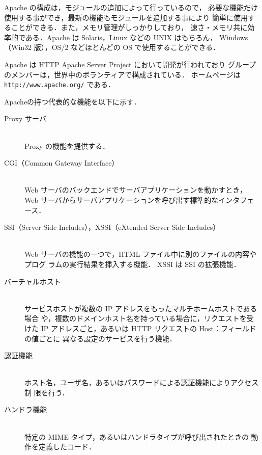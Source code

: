 Apache の構成は，モジュールの追加によって行っているので，
必要な機能だけ使用する事ができ，最新の機能もモジュールを追加する事により
簡単に使用することができる．また，メモリ管理がしっかりしており，
速さ・メモリ共に効率的である．Apache は Solaris，Linux などの UNIX はもちろん，
Windows（Win32 版），OS/2 などほとんどの OS で使用することができる．

Apache は HTTP Apache Server Project において開発が行われており
グループのメンバーは，世界中のボランティアで構成されている．
ホームページは \texttt{http://www.apache.org/} である．

Apacheの持つ代表的な機能を以下に示す．

\begin{description}
 \item[Proxy サーバ] \ \\
      Proxy の機能を提供する．

 \item[CGI（Common Gateway Interface）] \ \\
      Web サーバのバックエンドでサーバアプリケーションを動かすとき，
      Web サーバからサーバアプリケーションを呼び出す標準的なインタフェース．

 \item[SSI（Server Side Includes），XSSI（eXtended Server Side Includes）] \ \\
      Web サーバの機能の一つで，HTML ファイル中に別のファイルの内容やプログ
      ラムの実行結果を挿入する機能．
      XSSI は SSI の拡張機能．

 \item[バーチャルホスト] \ \\
      サービスホストが複数の IP アドレスをもったマルチホームホストである場合
      や，複数のドメインホスト名を持っている場合に，リクエストを受けた %
      IP アドレスごと，あるいは HTTP リクエストの Host：フィールドの値ごとに
      異なる設定のサービスを行う機能．

 \item[認証機能] \ \\
      ホスト名，ユーザ名，あるいはパスワードによる認証機能によりアクセス制
      限を行う．

 \item[ハンドラ機能] \ \\
      特定の MIME タイプ，あるいはハンドラタイプが呼び出されたときの
      動作を定義したコード．
\end{description}

